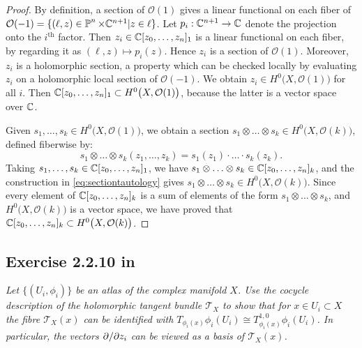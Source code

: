\documentclass{article}
\begin{document}
\begin{proof}
By definition, a section of $\mathcal{O}(1)$ gives a linear functional on each fiber of $\mathcal{O}(-1)
= \{(\ell, z) \in \operatorname{\mathbb{P}}^n \times \mathbb{C}^{n+1} | z \in \ell \}$. Let $p_i : \mathbb{C}^{n+1} \to \mathbb{C}$ denote the projection
onto the $i^{\text{th}}$ factor. Then $z_i \in \mathbb{C}[z_0, \dots, z_n]_1$ is a linear functional on each fiber,
by regarding it as $(\ell, z) \mapsto p_i(z)$. Hence $z_i$ is a section of $\mathcal{O}(1)$. Moreover, $z_i$
is a holomorphic section, a property which can be checked locally by evaluating $z_i$ on a holomorphic local 
section of $\mathcal{O}(-1)$. We obtain $z_i \in H^0\big(X, \mathcal{O}(1)\big)$ for all $i$. Then
$\mathbb{C}[z_0, \dots, z_n]_1 \subset H^0\big(X, \mathcal{O}(1)\big)$, because the latter is a vector space over $\mathbb{C}$.

Given $s_1, \dots, s_k \in H^0\big(X, \mathcal{O}(1)\big)$, we obtain a section $s_1 \otimes \ldots \otimes s_k
\in H^0\big(X, \mathcal{O}(k)\big)$, defined fiberwise by:
\begin{equation}
\label{eq:sectiontautology}
	s_1 \otimes \ldots \otimes s_k (z_1, \dots, z_k) = s_1(z_1) \cdot \ldots \cdot s_k(z_k).
\end{equation}
Taking $s_1, \dots, s_k \in \mathbb{C}[z_0, \dots, z_n]_1$, we have $s_1 \otimes \ldots \otimes s_k \in \mathbb{C}[z_0, \dots,
z_n]_k$, and the construction in \ref{eq:sectiontautology} gives $s_1 \otimes \ldots \otimes s_k \in 
H^0\big(X, \mathcal{O}(k)\big)$. Since every element of $\mathbb{C}[z_0, \dots,
z_n]_k$ is a sum of elements of the form $s_1 \otimes \ldots \otimes s_k$, and $H^0\big(X, \mathcal{O}(k)\big)$
is a vector space, we have proved that $\mathbb{C}[z_0, \dots,z_n]_k \subset H^0\big(X, \mathcal{O}(k)\big)$.
\end{proof}


\subsection*{Exercise 2.2.10 in \cite{Huy}}
\emph{Let $\{(U_i, \phi_i)\}$ be an atlas of the complex manifold $X$. Use the cocycle description of the
holomorphic tangent bundle $\mathcal{T}_X$ to show that for $x\in U_i \subset X$ the fibre $\mathcal{T}_X(x)$
can be identified with $T_{\phi_i(x)}\phi_i(U_i) \cong T^{1,0}_{\phi_i(x)}\phi_i(U_i)$. In particular, the
vectors $\partial/\partial z_i$ can be viewed as a basis of $\mathcal{T}_X(x)$.}
\end{document}

